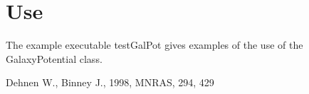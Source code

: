 \documentclass{article}
\begin{document}
\section{Use}
The example executable testGalPot gives examples of the use of the GalaxyPotential class.


\begin{thebibliography}{36}
 

{Dehnen} W., {Binney} J., 1998, MNRAS, 294, 429
 
\end{thebibliography}
 
\end{document}

